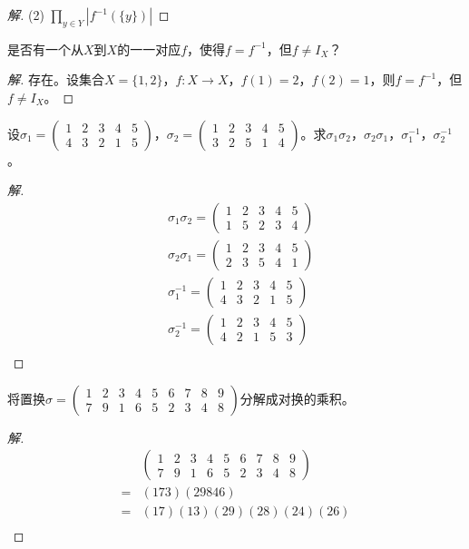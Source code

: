 \documentclass{article}
\begin{document}
\begin{CJK}{UTF8}{gbsn}
\begin{proof}[解]
(2) $\prod _{y\in Y}|f^{-1}(\{y\})|$
\end{proof}
\begin{Exercise}
是否有一个从$X$到$X$的一一对应$f$，使得$f=f^{-1}$，但$f\neq I_X$？
\end{Exercise}
\begin{proof}[解]
  存在。设集合$X=\{1,2\}$，$f:X\to X$，$f(1)=2$，$f(2)=1$，则$f=f^{-1}$，但$f\neq I_X$。
\end{proof}
\begin{Exercise}
 设$\sigma_1=\begin{pmatrix}1&2&3&4&5\\4&3&2&1&5\end{pmatrix}$，$\sigma_2=\begin{pmatrix}1&2&3&4&5\\3&2&5&1&4\end{pmatrix}$。求$\sigma_1\sigma_2$，$\sigma_2\sigma_1$，$\sigma_1^{-1}$，$\sigma_2^{-1}$。
\end{Exercise}
\begin{proof}[解]
  \begin{align*}
    &\sigma_1\sigma_2=\begin{pmatrix}1&2&3&4&5\\1&5&2&3&4\end{pmatrix}\\
    &\sigma_2\sigma_1=\begin{pmatrix}1&2&3&4&5\\2&3&5&4&1\end{pmatrix}\\
    &\sigma_1^{-1}=\begin{pmatrix}1&2&3&4&5\\4&3&2&1&5\end{pmatrix}\\
    &\sigma_2^{-1}=\begin{pmatrix}1&2&3&4&5\\4&2&1&5&3\end{pmatrix}\\
  \end{align*}
\end{proof}
\begin{Exercise}
  将置换$\sigma=\begin{pmatrix}1&2&3&4&5&6&7&8&9\\7&9&1&6&5&2&3&4&8\end{pmatrix}$分解成对换的乘积。
\end{Exercise}
\begin{proof}[解]
  \begin{align*}
    &\begin{pmatrix}1&2&3&4&5&6&7&8&9\\7&9&1&6&5&2&3&4&8\end{pmatrix}\\
    =&(173)(29846)\\
    =&(17)(13)(29)(28)(24)(26)\\
  \end{align*}
\end{proof}


\end{CJK}
\end{document}
